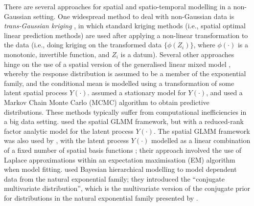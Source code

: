 \documentclass[12pt,a4paper]{article}
\begin{document}
There are several approaches for spatial and spatio-temporal modelling in a non-Gaussian setting.
One widespread method to deal with non-Gaussian data is \textit{trans-Gaussian kriging} \citep[pg.~137--138]{Cressie_1993_stats_for_spatial_data}, in which standard kriging methods (i.e., spatial optimal linear prediction methods) are used after applying a non-linear transformation to the data (i.e., doing kriging on the transformed data $\{\phi(Z_i)\}$, where $\phi(\cdot)$ is a monotonic, invertible function, and $Z_i$ is a datum). 
Several other approaches hinge on the use of a spatial version of the generalised linear mixed model \citep[GLMM;][]{Diggle_1998_spatial_GLMM}, whereby the response distribution is assumed to be a member of the exponential family, and the conditional mean is modelled using a transformation of some latent spatial process $Y(\cdot)$. 
\cite{Diggle_1998_spatial_GLMM} assumed a stationary model for $Y(\cdot)$, and used a Markov Chain Monte Carlo (MCMC) algorithm to obtain predictive distributions. 
These methods typically suffer from computational inefficiencies in a big data setting. 
\cite{Lopes_2011_spatial_GLMM_reduced_rank_factor_analytic_model} used the spatial GLMM framework, but with a reduced-rank factor analytic model for the latent process $Y(\cdot)$. 
The spatial GLMM framework was also used by \cite{Sengupta_Cressie_2013_spatial_GLMM_FRK}, with the latent process $Y(\cdot)$ modelled as a linear combination of a fixed number of spatial basis functions \citep{Cressie_Johannesson_2008_FRK}; their approach involved the use of Laplace approximations within an expectation maximisation (EM) algorithm when model fitting.
\cite{Bradley_2018_computationally_efficient_multivariate_ST_models_for_high-dimensional_count-valued_data,  Bradley_2020_Bayesian_Hierarchical_Models_With_Conjugate_Full-Conditional_Distributions_for_Dependent_Data_From_the_Natural_Exponential_Family} used Bayesian hierarchical modelling to model dependent data from the natural exponential family; they introduced the ``conjugate multivariate distribution'', which is the multivariate version of the conjugate prior for distributions in the natural exponential family presented by \cite{Diaconis_Ylvisaker_1979_conjugate_prior_natural_exponential_family}.
\end{document}
